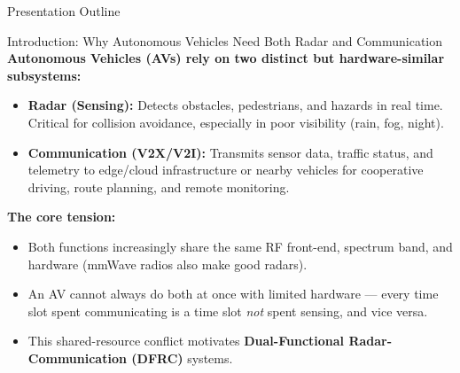 \documentclass[aspectratio=169]{beamer}
\begin{document}
\begin{frame}{Presentation Outline}
\end{frame}


\begin{frame}{Introduction: Why Autonomous Vehicles Need Both Radar and Communication}
  \textbf{Autonomous Vehicles (AVs) rely on two distinct but hardware-similar subsystems:}
  \begin{itemize}
    \item \textbf{Radar (Sensing):} Detects obstacles, pedestrians, and hazards in real time. Critical for collision avoidance, especially in poor visibility (rain, fog, night).
    \item \textbf{Communication (V2X/V2I):} Transmits sensor data, traffic status, and telemetry to edge/cloud infrastructure or nearby vehicles for cooperative driving, route planning, and remote monitoring.
  \end{itemize}

  \vspace{0.3cm}
  \textbf{The core tension:}
  \begin{itemize}
    \item Both functions increasingly share the same RF front-end, spectrum band, and hardware (mmWave radios also make good radars).
    \item An AV cannot always do both at once with limited hardware --- every time slot spent communicating is a time slot \emph{not} spent sensing, and vice versa.
    \item This shared-resource conflict motivates \textbf{Dual-Functional Radar-Communication (DFRC)} systems.
  \end{itemize}
\end{frame}
\end{document}
